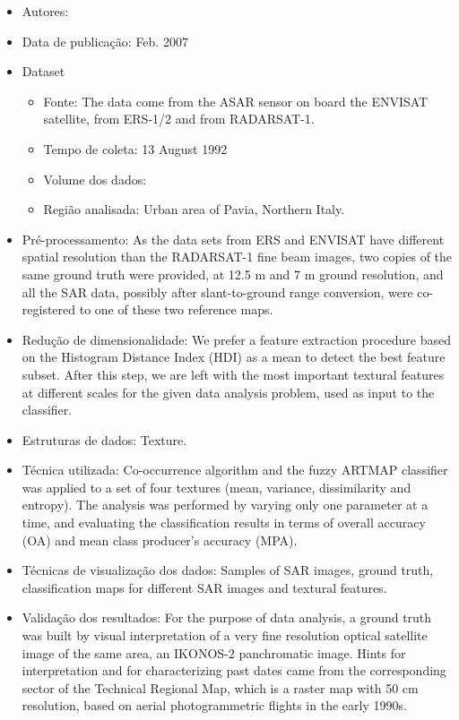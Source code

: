 \documentclass[paper=a4, fontsize=11pt]{scrartcl}
\begin{document}
\begin{itemize}
    \item Autores:~\cite{dell2006discriminating}
    \item Data de publicação: Feb. 2007
    \item Dataset
    \begin{itemize}
        \item Fonte: The data come from the ASAR sensor on board the ENVISAT satellite, from ERS-1/2 and from RADARSAT-1.
        \item Tempo de coleta: 13 August 1992
        \item Volume dos dados:
        \item Região analisada: Urban area of Pavia, Northern Italy.
    \end{itemize}
    \item Pré-processamento: As the data sets from ERS and ENVISAT have different spatial  resolution than the RADARSAT-1 fine beam images, two copies of the same ground truth were provided, at 12.5 m and 7 m ground resolution, and all the SAR data, possibly after slant-to-ground range conversion, were co-registered to one of these two reference maps.
    \item Redução de dimensionalidade: We prefer a feature extraction procedure based on the Histogram Distance Index (HDI) as a mean to detect the best feature subset. After this step, we are left with the most important textural features at different scales for the given data analysis problem, used as input to the classifier.
    \item Estruturas de dados: Texture.
    \item Técnica utilizada: Co-occurrence algorithm and the fuzzy ARTMAP classifier was applied to a set of four textures (mean, variance, dissimilarity and entropy). The analysis was performed by varying only one parameter at a time, and evaluating the classification results in terms of overall accuracy (OA) and mean class producer’s accuracy (MPA).
    \item Técnicas de visualização dos dados: Samples of SAR images, ground truth, classification maps for different SAR images and textural features.
    \item Validação dos resultados: For the purpose of data analysis, a ground truth was built by visual interpretation of a very fine resolution optical satellite image of the same area, an IKONOS-2 panchromatic image. Hints for interpretation and for characterizing past dates came from the corresponding sector of the Technical Regional Map, which is a raster map with 50 cm resolution, based on aerial photogrammetric flights in the early 1990s.

\end{itemize}
\end{document}

